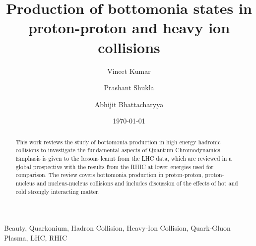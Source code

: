 \documentclass[review]{elsarticle}
\begin{document}
\fontsize{11}{15}
\selectfont

\begin{frontmatter}
  \title{Production of bottomonia states in proton-proton and heavy ion collisions}
  \author[NPD]{Vineet Kumar}
  \author[NPD,HBNI]{Prashant Shukla}
  \author[UOC]{Abhijit Bhattacharyya}
  \address[NPD]{Nuclear Physics Division, Bhabha Atomic Research Centre, Mumbai 400085, India}
  \address[UOC]{Department of Physics, University of Calcutta, 92, A. P. C. Road Kolkata-700009, India}
  \address[HBNI]{Homi Bhabha National Institute, Anushakti Nagar, Mumbai 400094, India}
  \date{\today}
  
  \begin{abstract}
    
    This work reviews the study of bottomonia production in high energy hadronic collisions to investigate
    the fundamental aspects of Quantum Chromodynamics. Emphasis is given to the lessons learnt from the LHC
    data, which are reviewed in a global prospective with the results from the RHIC at lower energies used
    for comparison. The review covers bottomonia production in proton-proton, proton-nucleus and nucleus-nucleus
    collisions and includes discussion of the effects of hot and cold strongly interacting matter.

  \end{abstract}
  
  \begin{keyword}
    Beauty, Quarkonium, Hadron Collision, Heavy-Ion Collision, Quark-Gluon Plasma, LHC, RHIC
  \end{keyword}
  


  

\maketitle

\tableofcontents


\end{frontmatter}









\end{document}
